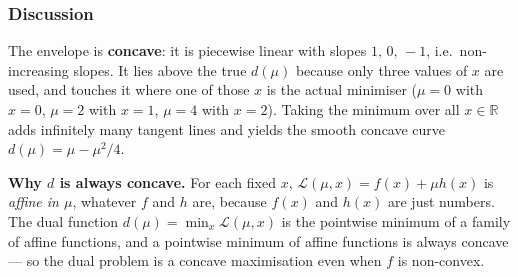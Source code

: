 \documentclass[11pt,a4paper]{article}
\newcommand{\Lag}{\mathcal{L}}
\begin{document}
\subsubsection*{Discussion}
The envelope is \textbf{concave}: it is piecewise linear with slopes $1,\,0,\,-1$, i.e.\ non-increasing slopes. It lies above the true $d(\mu)$ because only three values of $x$ are used, and touches it where one of those $x$ is the actual minimiser ($\mu=0$ with $x=0$, $\mu=2$ with $x=1$, $\mu=4$ with $x=2$). Taking the minimum over all $x\in\mathbb{R}$ adds infinitely many tangent lines and yields the smooth concave curve $d(\mu)=\mu-\mu^2/4$.

\begin{result}
\textbf{Why $d$ is always concave.} For each fixed $x$, $\Lag(\mu,x)=f(x)+\mu h(x)$ is \emph{affine in $\mu$}, whatever $f$ and $h$ are, because $f(x)$ and $h(x)$ are just numbers. The dual function $d(\mu)=\min_x\Lag(\mu,x)$ is the pointwise minimum of a family of affine functions, and a pointwise minimum of affine functions is always concave --- so the dual problem is a concave maximisation even when $f$ is non-convex.
\end{result}
\end{document}
